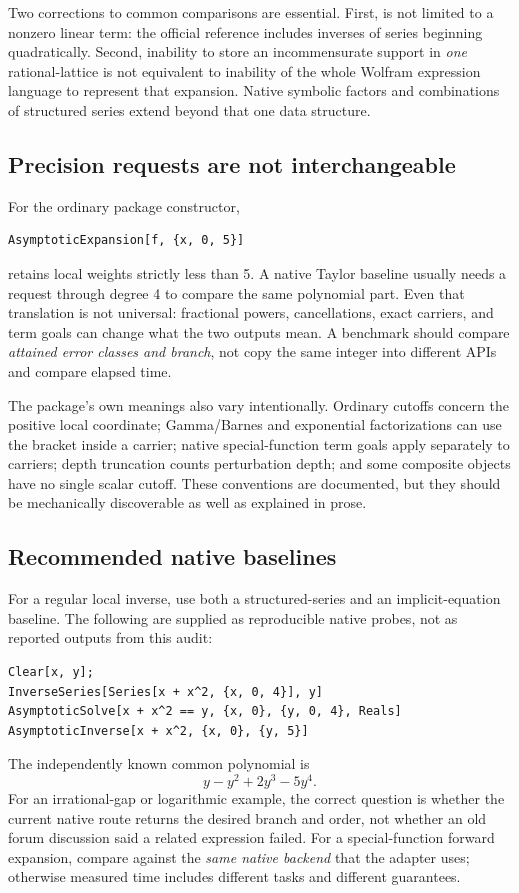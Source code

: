 \documentclass[11pt,a4paper]{article}
\newcommand{\code}[1]{\texttt{\detokenize{#1}}}
\begin{document}
Two corrections to common comparisons are essential. First, \code{InverseSeries} is not limited to a nonzero linear term: the official reference includes inverses of series beginning quadratically. Second, inability to store an incommensurate support in \emph{one} rational-lattice \code{SeriesData} is not equivalent to inability of the whole Wolfram expression language to represent that expansion. Native symbolic factors and combinations of structured series extend beyond that one data structure.\cite{wl-inverse,wl-seriesdata}

\subsection{Precision requests are not interchangeable}

For the ordinary package constructor,
\begin{lstlisting}
AsymptoticExpansion[f, {x, 0, 5}]
\end{lstlisting}
retains local weights strictly less than 5. A native Taylor baseline usually needs a request through degree 4 to compare the same polynomial part. Even that translation is not universal: fractional powers, cancellations, exact carriers, and term goals can change what the two outputs mean. A benchmark should compare \emph{attained error classes and branch}, not copy the same integer into different APIs and compare elapsed time.

The package's own meanings also vary intentionally. Ordinary cutoffs concern the positive local coordinate; Gamma/Barnes and exponential factorizations can use the bracket inside a carrier; native special-function term goals apply separately to carriers; depth truncation counts perturbation depth; and some composite objects have no single scalar cutoff. These conventions are documented, but they should be mechanically discoverable as well as explained in prose.\cite{guide,native,gamma}

\subsection{Recommended native baselines}

For a regular local inverse, use both a structured-series and an implicit-equation baseline. The following are supplied as reproducible native probes, not as reported outputs from this audit:
\begin{lstlisting}
Clear[x, y];
InverseSeries[Series[x + x^2, {x, 0, 4}], y]
AsymptoticSolve[x + x^2 == y, {x, 0}, {y, 0, 4}, Reals]
AsymptoticInverse[x + x^2, {x, 0}, {y, 5}]
\end{lstlisting}
The independently known common polynomial is
\begin{equation}
 y-y^2+2y^3-5y^4.
\end{equation}
For an irrational-gap or logarithmic example, the correct question is whether the current native route returns the desired branch and order, not whether an old forum discussion said a related expression failed. For a special-function forward expansion, compare against the \emph{same native backend} that the adapter uses; otherwise measured time includes different tasks and different guarantees.
\end{document}
